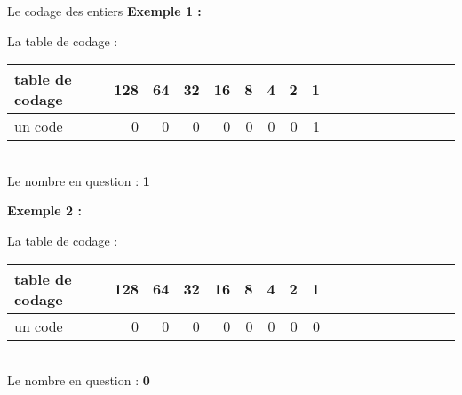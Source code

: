 
\begin{frame}{Le codage des entiers}
    \textbf{Exemple 1 :}
    \begin{center}
        La table de codage : \\
        $\;$\\
        \begin{tabular}{|*{2}{l||r|r|r|r|r|r|r|r|}}
            \hline
                table de codage & 128 & 64 & 32 & 16 & 8 & 4 & 2 & 1 \\
            \hline
                un code         & 0   & 0  & 0  & 0  & 0 & 0 & 0 & 1 \\
            \hline
        \end{tabular} \\
        $\;$\\
        Le nombre en question : \textbf{1} \\
    \end{center}
    \textbf{Exemple 2 :}
    \begin{center}
        La table de codage : \\
        $\;$\\
        \begin{tabular}{|*{2}{l||r|r|r|r|r|r|r|r|}}
            \hline
                table de codage & 128 & 64 & 32 & 16 & 8 & 4 & 2 & 1 \\
            \hline
                un code         & 0   & 0  & 0  & 0  & 0 & 0 & 0 & 0 \\
            \hline
        \end{tabular} \\
        $\;$\\
        Le nombre en question : \textbf{0} \\
    \end{center}
\end{frame}

